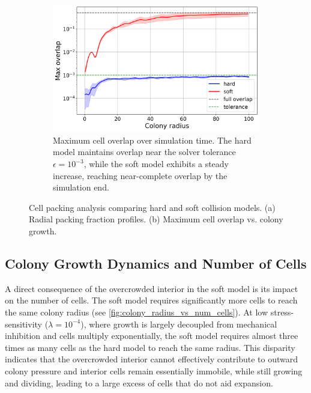\documentclass[conference]{IEEEtran}
\begin{document}
\begin{figure}[H]
    \begin{subfigure}[b]{\linewidth}
        \centering
        \includegraphics[width=\linewidth]{figures/comparison_plots/combined_colony_radius_vs_max_overlap_with_lines.png}
        \caption{Maximum cell overlap over simulation time. The hard model maintains overlap near the solver tolerance $\epsilon = 10^{-3}$, while the soft model exhibits a steady increase, reaching near-complete overlap by the simulation end.}
        \label{fig:max_overlap_simulation}
    \end{subfigure}

    \caption{Cell packing analysis comparing hard and soft collision models. (a) Radial packing fraction profiles. (b) Maximum cell overlap vs. colony growth.}
    \label{fig:combined_packing_analysis}
\end{figure}

\subsection{Colony Growth Dynamics and Number of Cells}
\label{sec:colony_growth_dynamics}

A direct consequence of the overcrowded interior in the soft model is its impact on the number of cells. The soft model requires significantly more cells to reach the same colony radius (see \autoref{fig:colony_radius_vs_num_cells}). At low stress-sensitivity ($\lambda = 10^{-4}$), where growth is largely decoupled from mechanical inhibition and cells multiply exponentially, the soft model requires almost three times as many cells as the hard model to reach the same radius. This disparity indicates that the overcrowded interior cannot effectively contribute to outward colony pressure and interior cells remain essentially immobile, while still growing and dividing, leading to a large excess of cells that do not aid expansion.
\end{document}
